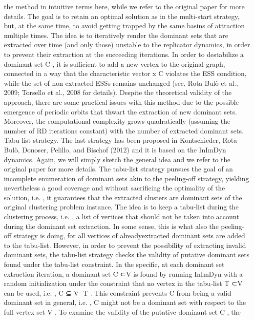 \documentclass[a4paper]{article}
\begin{document}
the method in intuitive terms here, while we refer to the original
paper for more details. The goal is to retain an optimal solution as
in the multi-start strategy, but, at the same time, to avoid getting
trapped by the same basins of attraction multiple times. The idea
is to iteratively render the dominant sets that are extracted over
time (and only those) unstable to the replicator dynamics, in order
to prevent their extraction at the succeeding iterations. In order
to destabilize a dominant set C , it is sufficient to add a new vertex
to the original graph, connected in a way that the characteristic
vector x C violates the ESS condition, while the set of non-extracted
ESSs remains unchanged (see, Rota Bulò et al., 2009; Torsello et al.,
2008 for details). Despite the theoretical validity of the approach,
there are some practical issues with this method due to the possible
emergence of periodic orbits that thwart the extraction of new
dominant sets. Moreover, the computational complexity grows
quadratically (assuming the number of RD iterations constant)
with the number of extracted dominant sets.
Tabu-list strategy. The last strategy has been proposed
in Kontschieder, Rota Bulò, Donoser, Pelillo, and Bischof (2012) and
it is based on the InImDyn dynamics. Again, we will simply sketch
the general idea and we refer to the original paper for more
details. The tabu-list strategy pursues the goal of an incomplete
enumeration of dominant sets akin to the peeling-off strategy,
yielding nevertheless a good coverage and without sacrificing the
optimality of the solution, i.e. , it guarantees that the extracted
clusters are dominant sets of the original clustering problem
instance. The idea is to keep a tabu-list during the clustering
process, i.e. , a list of vertices that should not be taken into account
during the dominant set extraction. In some sense, this is what
also the peeling-off strategy is doing, for all vertices of alreadyextracted
dominant sets are added to the tabu-list. However, in
order to prevent the possibility of extracting invalid dominant
sets, the tabu-list strategy checks the validity of putative dominant
sets found under the tabu-list constraint. In the specific, at each
dominant set extraction iteration, a dominant set C ⊂V is found by
running InImDyn with a random initialization under the constraint
that no vertex in the tabu-list T ⊂V can be used, i.e. , C ⊆ V T . This
constraint prevents C from being a valid dominant set in general,
i.e. , C might not be a dominant set with respect to the full vertex
set V . To examine the validity of the putative dominant set C , the
\end{document}
